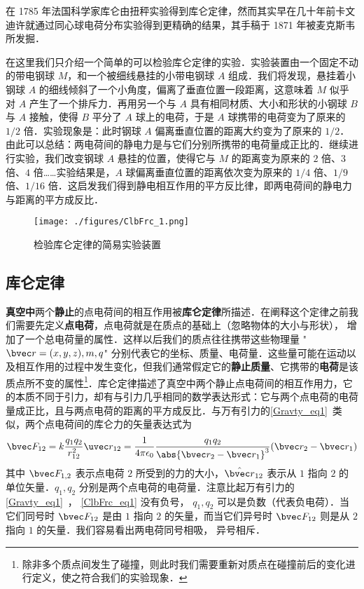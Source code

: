 

在 1785 年法国科学家库仑由扭秤实验得到库仑定律，然而其实早在几十年前卡文迪许就通过同心球电荷分布实验得到更精确的结果，其手稿于 1871 年被麦克斯韦所发掘．

在这里我们只介绍一个简单的可以检验库仑定律的实验．实验装置由一个固定不动的带电钢球 $M$，和一个被细线悬挂的小带电钢球 $A$ 组成．我们将发现，悬挂着小钢球 $A$ 的细线倾斜了一个小角度，偏离了垂直位置一段距离，这意味着 $M$ 似乎对 $A$ 产生了一个排斥力．再用另一个与 $A$ 具有相同材质、大小和形状的小钢球 $B$ 与 $A$ 接触，使得 $B$ 平分了 $A$ 球上的电荷，于是 $A$ 球携带的电荷变为了原来的 $1/2$ 倍．实验现象是：此时钢球 $A$ 偏离垂直位置的距离大约变为了原来的 $1/2$．由此可以总结：两电荷间的静电力是与它们分别所携带的电荷量成正比的．继续进行实验，我们改变钢球 $A$ 悬挂的位置，使得它与 $M$ 的距离变为原来的 $2$ 倍、$3$ 倍、$4$ 倍……实验结果是，$A$ 球偏离垂直位置的距离依次变为原来的 $1/4$ 倍、$1/9$ 倍、$1/16$ 倍．这启发我们得到静电相互作用的平方反比律，即两电荷间的静电力与距离的平方成反比．
\begin{figure}[ht]
\centering
\texttt{[image: ./figures/ClbFrc\_1.png]}
\caption{检验库仑定律的简易实验装置} \label{ClbFrc_fig1}
\end{figure}

\subsection{库仑定律}
\textbf{真空中}两个\textbf{静止}的点电荷间的相互作用被\textbf{库仑定律}所描述．在阐释这个定律之前我们需要先定义\textbf{点电荷}，点电荷就是在质点的基础上（忽略物体的大小与形状）， 增加了一个总电荷量的属性．这样以后我们的质点往往携带这些物理量 "$\bvec r=(x,y,z),m,q$" 分别代表它的坐标、质量、电荷量．这些量可能在运动以及相互作用的过程中发生变化，但我们通常假定它的\textbf{静止质量}、它携带的\textbf{电荷}是该质点所不变的属性\footnote{除非多个质点间发生了碰撞，则此时我们需要重新对质点在碰撞前后的变化进行定义，使之符合我们的实验现象．}．库仑定律描述了真空中两个静止点电荷间的相互作用力，它的本质不同于引力，却有与引力几乎相同的数学表达形式：它与两个点电荷的电荷量成正比，且与两点电荷的距离的平方成反比．与万有引力的\autoref{Gravty_eq1}~类似，两个点电荷间的库仑力的矢量表达式为
\begin{equation}\label{ClbFrc_eq1}
\bvec F_{12} = k\frac{q_1 q_2}{r_{12}^2} \uvec r_{12} = \frac{1}{4\pi\epsilon_0} \frac{q_1 q_2}{\abs{\bvec r_2 - \bvec r_1}^3}(\bvec r_2 - \bvec r_1)
\end{equation}
其中 $\bvec F_{1,2}$ 表示点电荷 $2$ 所受到的力的大小，$\hat{\bvec r}_{12}$ 表示从 $1$ 指向 $2$ 的单位矢量．$q_1, q_2$ 分别是两个点电荷的电荷量．注意比起万有引力的\autoref{Gravty_eq1}~， \autoref{ClbFrc_eq1} 没有负号， $q_1, q_2$ 可以是负数（代表负电荷）．当它们同号时 $\bvec F_{12}$ 是由 $1$ 指向 $2$ 的矢量，而当它们异号时 $\bvec F_{12}$ 则是从 $2$ 指向 $1$ 的矢量．我们容易看出两电荷同号相吸， 异号相斥．

